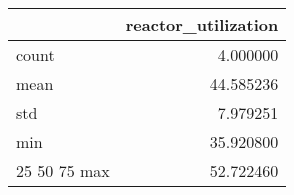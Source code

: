 \begin{tabular}{lr}
\toprule
 & reactor\_utilization \\
\midrule
count & 4.000000 \\
mean & 44.585236 \\
std & 7.979251 \\
min & 35.920800 \\
25%
50%
75%
max & 52.722460 \\
\bottomrule
\end{tabular}

